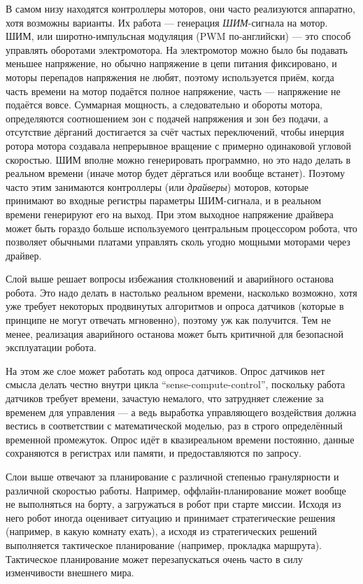 \documentclass{../../text-style}
\begin{document}
В самом низу находятся контроллеры моторов, они часто реализуются аппаратно, хотя возможны варианты.
Их работа --- генерация \emph{ШИМ}-сигнала на мотор.
ШИМ, или широтно-импульсная модуляция (PWM по-английски) --- это способ управлять оборотами электромотора. 
На электромотор можно было бы подавать меньшее напряжение, но обычно напряжение в цепи питания фиксировано, и моторы перепадов напряжения не любят, поэтому используется приём, когда часть времени на мотор подаётся полное напряжение, часть --- напряжение не подаётся вовсе.
Суммарная мощность, а следовательно и обороты мотора, определяются соотношением зон с подачей напряжения и зон без подачи, а отсутствие дёрганий достигается за счёт частых переключений, чтобы инерция ротора мотора создавала непрерывное вращение с примерно одинаковой угловой скоростью.
ШИМ вполне можно генерировать программно, но это надо делать в реальном времени (иначе мотор будет дёргаться или вообще встанет).
Поэтому часто этим занимаются контроллеры (или \emph{драйверы}) моторов, которые принимают во входные регистры параметры ШИМ-сигнала, и в реальном времени генерируют его на выход.
При этом выходное напряжение драйвера может быть гораздо больше используемого центральным процессором робота, что позволяет обычными платами управлять сколь угодно мощными моторами через драйвер.

Слой выше решает вопросы избежания столкновений и аварийного останова робота.
Это надо делать в настолько реальном времени, насколько возможно, хотя уже требует некоторых продвинутых алгоритмов и опроса датчиков (которые в принципе не могут отвечать мгновенно), поэтому уж как получится.
Тем не менее, реализация аварийного останова может быть критичной для безопасной эксплуатации робота.

На этом же слое может работать код опроса датчиков.
Опрос датчиков нет смысла делать честно внутри цикла \enquote{sense-compute-control}, поскольку работа датчиков требует времени, зачастую немалого, что затрудняет слежение за временем для управления --- а ведь выработка управляющего воздействия должна вестись в соответствии с математической моделью, раз в строго определённый временной промежуток.
Опрос идёт в квазиреальном времени постоянно, данные сохраняются в регистрах или памяти, и предоставляются по запросу.

Слои выше отвечают за планирование с различной степенью гранулярности и различной скоростью работы.
Например, оффлайн-планирование может вообще не выполняться на борту, а загружаться в робот при старте миссии.
Исходя из него робот иногда оценивает ситуацию и принимает стратегические решения (например, в какую комнату ехать), а исходя из стратегических решений выполняется тактическое планирование (например, прокладка маршрута).
Тактическое планирование может перезапускаться очень часто в силу изменчивости внешнего мира.
\end{document}

